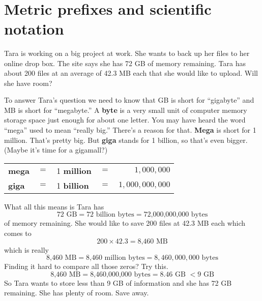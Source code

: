 ~\vspace{.1in}

\section{Metric prefixes and scientific notation} 

Tara is working on a big project at work.  She wants to back up her files to her online drop box. The site says she has 72 GB of memory remaining.  Tara has about 200 files at an average of 42.3 MB each that she would like to upload.  Will she have room?

To answer Tara's question we need to know that GB is short for ``gigabyte'' and MB is short for ``megabyte.''  A \textbf{byte} is a very small unit of computer memory storage space just enough for about one letter.  You may have heard the word ``mega'' used to mean ``really big.''  There's a reason for that.  \textbf{Mega} is short for 1 million.  That's pretty big.  But \textbf{giga} stands for 1 billion, so that's even bigger.  (Maybe it's time for a gigamall?) 
\begin{center}
\begin{tabular} {lclcr} 
\textbf{mega} &$=$&1 \textbf{ million} &$=$&$ 1,000,000$\\
\textbf{giga} &$=$& 1 \textbf{ billion} &$=$& $1,000,000,000$\\ 
\end{tabular}
\end{center}

What all this means is Tara has
$$72\text{ GB} = 72 \text{ billion bytes} = \text{72,000,000,000 bytes}$$
of memory remaining.
She would like to save 200 files at 42.3 MB each which comes to
$$200 \times 42.3 = \text{8,460 MB}$$
which is really $$ \text{8,460 MB} = \text{8,460 million bytes} = 8,460,000,000 \text{ bytes}$$
Finding it hard to compare all those zeros?  Try this.
$$ \text{8,460 MB} = \text{8,460,000,000 bytes} = 8.46 \text{ GB } < 9 \text{ GB}$$
So Tara wants to store less than 9 GB of information and she has 72 GB remaining.  She has plenty of room.  Save away.

